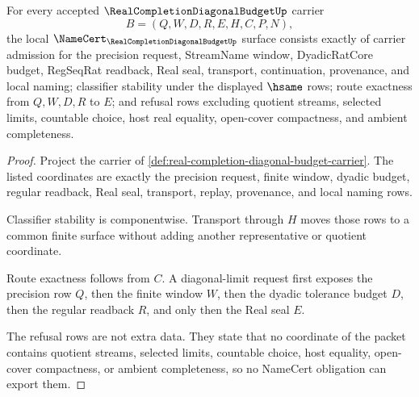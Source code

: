 \begin{theorem}
\label{thm:real-completion-diagonal-budget-namecert-obligations}
For every accepted $\RealCompletionDiagonalBudgetUp$ carrier
$$
B=(Q,W,D,R,E,H,C,P,N),
$$
the local $\NameCert_{\RealCompletionDiagonalBudgetUp}$ surface consists
exactly of carrier admission for the precision request, StreamName window,
DyadicRatCore budget, RegSeqRat readback, Real seal, transport, continuation,
provenance, and local naming; classifier stability under the displayed
$\hsame$ rows; route exactness from $Q,W,D,R$ to $E$; and refusal rows
excluding quotient streams, selected limits, countable choice, host real
equality, open-cover compactness, and ambient completeness.
\end{theorem}
\begin{proof}
Project the carrier of
\autoref{def:real-completion-diagonal-budget-carrier}. The listed coordinates
are exactly the precision request, finite window, dyadic budget, regular
readback, Real seal, transport, replay, provenance, and local naming rows.

Classifier stability is componentwise. Transport through $H$ moves those rows
to a common finite surface without adding another representative or quotient
coordinate.

Route exactness follows from $C$. A diagonal-limit request first exposes the
precision row $Q$, then the finite window $W$, then the dyadic tolerance budget
$D$, then the regular readback $R$, and only then the Real seal $E$.

The refusal rows are not extra data. They state that no coordinate of the
packet contains quotient streams, selected limits, countable choice, host
equality, open-cover compactness, or ambient completeness, so no NameCert
obligation can export them.
\end{proof}

